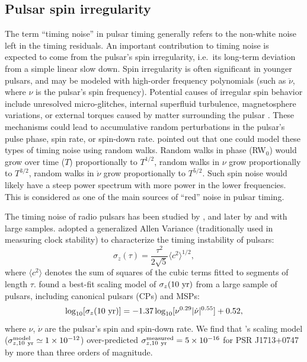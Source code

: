 
\subsection{Pulsar spin irregularity}
\label{sec:spin}

The term ``timing noise'' in pulsar timing generally refers to the non-white
noise left in the timing residuals.
An important contribution to timing noise is expected to come from the pulsar's spin
irregularity, i.e.~its long-term deviation from a simple linear slow down. 
Spin irregularity is often significant in younger pulsars, and 
may be modeled with high-order frequency polynomials (such as $\ddot{\nu}$, where $\nu$ is the pulsar's spin frequency). 
Potential causes of irregular spin behavior include unresolved
micro-glitches, internal superfluid turbulence, magnetosphere variations, or external torques caused by matter surrounding the pulsar \citep{hlk10, ymh+13, ml14}.
These mechanisms could lead to accumulative random perturbations in the 
pulsar's pulse phase, spin rate, or spin-down rate. 
\citet{sc10} pointed out that one could model these types of timing noise using random walks.
Random walks in phase (RW$_0$) would grow over time ($T$)
proportionally to $T^{1/2}$, random walks in $\nu$ grow proportionally to
$T^{3/2}$, random walks in
$\dot{\nu}$ grow proportionally to $T^{5/2}$.
Such spin noise would likely have a steep power spectrum with more power in
the lower frequencies. This
is considered as one of the main sources of ``red'' noise in pulsar timing.


The timing noise of radio pulsars has been studied by
\citet{ch80,cd85,antt94,dmhd95, mtem97}, and later by \citet{hlk10} and
\citet{sc10} with large samples. 
\citet{mtem97} adopted a generalized Allen Variance (traditionally used in
measuring clock stability) to characterize the timing instability of pulsars:
\begin{equation}
\label{eq:sigmaz}
\sigma_z(\tau) = \frac{\tau^2}{2\sqrt{5}}\langle c^2 \rangle^{1/2},
\end{equation}
where $\langle c^2\rangle$ denotes the sum of squares of the cubic
terms fitted to segments of length $\tau$. 
\citet{hlk10} found a best-fit scaling model of $\sigma_z({\rm 10~yr})$ 
from a large sample of pulsars, including canonical pulsars (CPs) and MSPs:
\begin{equation}
\label{eq:hlk10}
\log_{10}[\sigma_z({\rm 10~yr})] =
-1.37\log_{10}[\nu^{0.29}|\dot{\nu}|^{0.55}]+0.52,
\end{equation} 
where $\nu$, $\dot{\nu}$ are the pulsar's spin and spin-down rate.
We find that \citet{hlk10}'s scaling model ($\sigma^{\rm model}_{z, \rm
10~yr}\simeq1\times10^{-12}$) over-predicted $\sigma^{\rm measured}_{z, \rm
10~yr}=5\times10^{-16}$ for PSR J1713+0747 by more than three orders of magnitude. 


